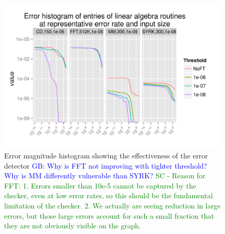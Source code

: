 \documentclass{sig-alternate}
\newcommand{\sui}[1]{%
  \textcolor{green}{SC - #1}
}
\newcommand{\greg}[1]{%
  \textcolor{blue}{GB: #1}
}
\begin{document}
\begin{figure}[ht!]
\centering
\includegraphics[width=1.00\columnwidth]{figs/4_1_1_Exp2_1_Example.png}
\caption{Error magnitude histogram showing the effectiveness of the error detector \greg{Why is FFT not improving with tighter threshold? Why is MM differently vulnerable than SYRK?} \sui{Reason for FFT: 1. Errors smaller than 10e-5 cannot be captured by the checker, even at low error rates, so this should be the fundamental limitation of the checker. 2. We actually are seeing reduction in large errors, but those large errors account for such a small fraction that they are not obviously visible on the graph.}}
\label{fig:algo_err_dist}
\end{figure}
\end{document}
